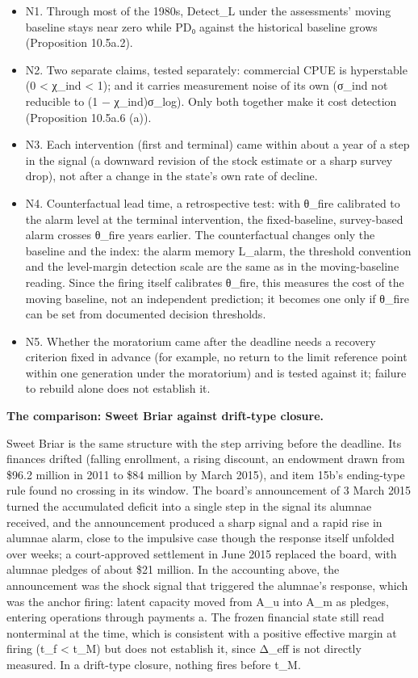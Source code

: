 \documentclass[
]{article}
\begin{document}
\begin{itemize}
\item
  N1. Through most of the 1980s, Detect\_L under the assessments' moving
  baseline stays near zero while PD₀ against the historical baseline
  grows (Proposition 10.5a.2).
\item
  N2. Two separate claims, tested separately: commercial CPUE is
  hyperstable (0 \textless{} χ\_ind \textless{} 1); and it carries
  measurement noise of its own (σ\_ind not reducible to (1 −
  χ\_ind)σ\_log). Only both together make it cost detection (Proposition
  10.5a.6 (a)).
\item
  N3. Each intervention (first and terminal) came within about a year of
  a step in the signal (a downward revision of the stock estimate or a
  sharp survey drop), not after a change in the state's own rate of
  decline.
\item
  N4. Counterfactual lead time, a retrospective test: with θ\_fire
  calibrated to the alarm level at the terminal intervention, the
  fixed-baseline, survey-based alarm crosses θ\_fire years earlier. The
  counterfactual changes only the baseline and the index: the alarm
  memory L\_alarm, the threshold convention and the level-margin
  detection scale are the same as in the moving-baseline reading. Since
  the firing itself calibrates θ\_fire, this measures the cost of the
  moving baseline, not an independent prediction; it becomes one only if
  θ\_fire can be set from documented decision thresholds.
\item
  N5. Whether the moratorium came after the deadline needs a recovery
  criterion fixed in advance (for example, no return to the limit
  reference point within one generation under the moratorium) and is
  tested against it; failure to rebuild alone does not establish it.
\end{itemize}

\textbf{The comparison: Sweet Briar against drift-type closure.}

Sweet Briar is the same structure with the step arriving before the
deadline. Its finances drifted (falling enrollment, a rising discount,
an endowment drawn from \$96.2 million in 2011 to \$84 million by March
2015), and item 15b's ending-type rule found no crossing in its window.
The board's announcement of 3 March 2015 turned the accumulated deficit
into a single step in the signal its alumnae received, and the
announcement produced a sharp signal and a rapid rise in alumnae alarm,
close to the impulsive case though the response itself unfolded over
weeks; a court-approved settlement in June 2015 replaced the board, with
alumnae pledges of about \$21 million. In the accounting above, the
announcement was the shock signal that triggered the alumnae's response,
which was the anchor firing: latent capacity moved from A\_u into A\_m
as pledges, entering operations through payments a. The frozen financial
state still read nonterminal at the time, which is consistent with a
positive effective margin at firing (t\_f \textless{} t\_M) but does not
establish it, since Δ\_eff is not directly measured. In a drift-type
closure, nothing fires before t\_M.
\end{document}
